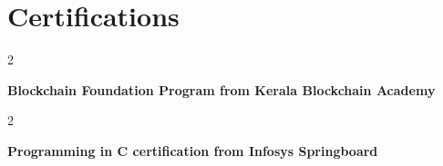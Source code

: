 \documentclass[10pt, a4paper]{article}
\newenvironment{twocolentry}[2][]{
    \onecolentry
    \def\secondColumn{#2}
    \setcolumnwidth{\fill, 4.5 cm}
    \begin{paracol}{2}
}{
    \switchcolumn \raggedleft \secondColumn
    \end{paracol}
    \endonecolentry
} %
\begin{document}
        \section{Certifications}
    
            \begin{twocolentry}{
            }
                \textbf{Blockchain Foundation Program from Kerala Blockchain Academy}
                \end{twocolentry}
                
        \begin{twocolentry}{
            }
                \textbf{Programming in C certification from Infosys Springboard}
                \end{twocolentry}
\end{document}
